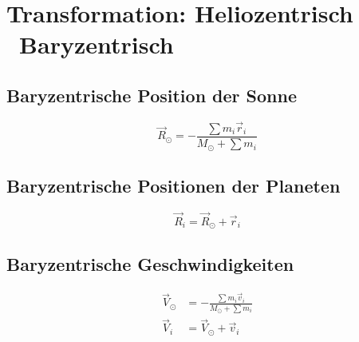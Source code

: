 \section{Transformation: Heliozentrisch \textrightarrow\ Baryzentrisch}

\subsection*{Baryzentrische Position der Sonne}
\begin{equation}
\vec{R}_\odot = -\frac{\sum m_i \vec{r}_i}{M_\odot + \sum m_i}
\end{equation}

\subsection*{Baryzentrische Positionen der Planeten}
\begin{equation}
\vec{R}_i = \vec{R}_\odot + \vec{r}_i
\end{equation}

\subsection*{Baryzentrische Geschwindigkeiten}
\begin{align}
\vec{V}_\odot &= -\frac{\sum m_i \vec{v}_i}{M_\odot + \sum m_i} \\
\vec{V}_i &= \vec{V}_\odot + \vec{v}_i
\end{align}